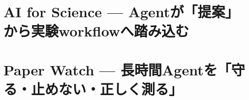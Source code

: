 \documentclass[lualatex,a4paper,11pt]{jlreq}
\begin{document}
\Needspace{0.45\textheight}
\bigskip
\section{AI for Science — Agentが「提案」から実験workflowへ踏み込む}
\label{pkg:ai-for-science-june}
\vspace{0.15em}
\begin{multicols}{2}

\end{multicols}
\Needspace{0.34\textheight}

\medskip


\Needspace{0.45\textheight}
\bigskip
\section{Paper Watch — 長時間Agentを「守る・止めない・正しく測る」}
\label{pkg:paper-watch-june}
\vspace{0.15em}
\begin{multicols}{2}

\end{multicols}


\Needspace{0.40\textheight}

\medskip

\Needspace{0.55\textheight}
\bigskip

\bigskip
\printbibliography[title={References / Source Notes}]
\end{document}
